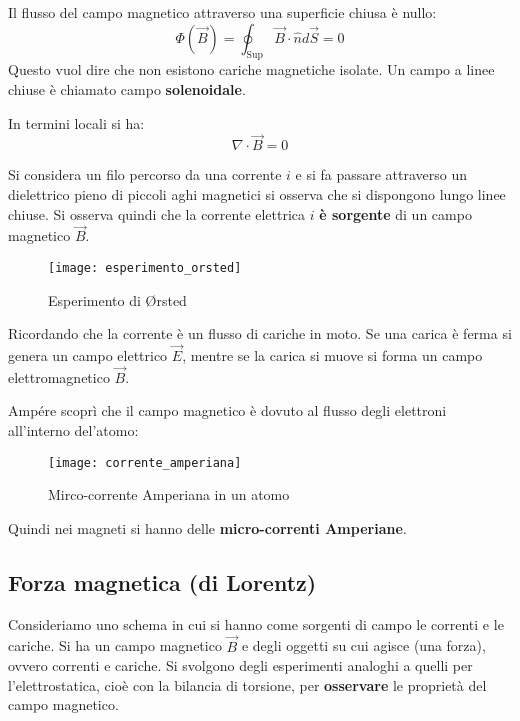 \documentclass[a4paper]{article}
\begin{document}
\begin{definition}
  \label{prima-eq-maxwell-campo-magnetico}
  Il flusso del campo magnetico attraverso una superficie chiusa è nullo:
  \[
    \Phi(\vec{B}) = \oint_{\text{Sup}} \vec{B} \cdot \hat{n} d\vec{S} = 0
  \]
  Questo vuol dire che non esistono cariche magnetiche isolate.
  Un campo a linee chiuse è chiamato campo \textbf{solenoidale}.

  In termini locali si ha:
  \[
    \nabla \cdot \vec{B} = 0
  \]
\end{definition}

\begin{example}
  Si considera un filo percorso da una corrente \( i \) e si fa passare attraverso
  un dielettrico pieno di piccoli aghi magnetici si osserva che si dispongono lungo
  linee chiuse. Si osserva quindi che la corrente elettrica \( i \) \textbf{è sorgente}
  di un campo magnetico \( \vec{B} \).
  \begin{figure}[H]
    \centering
    \texttt{[image: esperimento\_orsted]}
    \caption{Esperimento di Ørsted}
  \end{figure}
  \noindent
  Ricordando che la corrente è un flusso di cariche in moto. Se una carica è ferma si
  genera un campo elettrico \( \vec{E} \), mentre se la carica si muove si forma un
  campo elettromagnetico \( \vec{B} \).
\end{example}
Ampére scoprì che il campo magnetico è dovuto al flusso degli elettroni all'interno
del'atomo:
\begin{figure}[H]
  \centering
  \texttt{[image: corrente\_amperiana]}
  \caption{Mirco-corrente Amperiana in un atomo}
\end{figure}
\noindent
Quindi nei magneti si hanno delle \textbf{micro-correnti Amperiane}.

\subsection{Forza magnetica (di Lorentz)}
Consideriamo uno schema in cui si hanno come sorgenti di campo le correnti e le cariche.
Si ha un campo magnetico \( \vec{B} \) e degli oggetti su cui agisce (una forza),
ovvero correnti e cariche.
Si svolgono degli esperimenti analoghi a quelli per l'elettrostatica, cioè con la bilancia
di torsione, per \textbf{osservare} le proprietà del campo magnetico.
\end{document}

